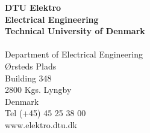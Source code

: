 \thispagestyle{empty} %
\frieze
\vspace*{\fill}
\noindent
\sffamily
\small
\textbf{DTU Elektro}\\
\textbf{Electrical Engineering}\\
\textbf{Technical University of Denmark}\\
\\
Department of Electrical Engineering \\
Ørsteds Plads \\
Building 348 \\
2800 Kgs. Lyngby \\
Denmark \\
Tel (+45) 45 25 38 00 \\
www.elektro.dtu.dk \\
\normalsize
\normalfont
\vspace*{2.5cm}